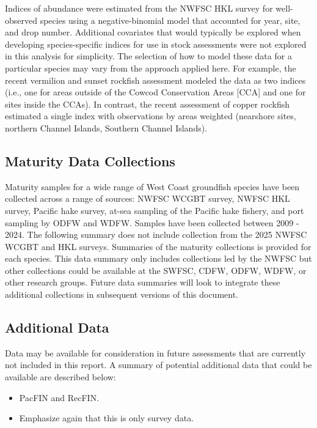 \documentclass[11pt,
  letterpaper,
]{article}
\begin{document}
Indices of abundance were estimated from the NWFSC HKL survey for well-observed species using a negative-binomial model that accounted for year, site, and drop number. Additional covariates that would typically be explored when developing species-specific indices for use in stock assessments were not explored in this analysis for simplicity. The selection of how to model these data for a particular species may vary from the approach applied here. For example, the recent vermilion and sunset rockfish assessment modeled the data as two indices (i.e., one for areas outside of the Cowcod Conservation Areas {[}CCA{]} and one for sites inside the CCAs). In contrast, the recent assessment of copper rockfish estimated a single index with observations by areas weighted (nearshore sites, northern Channel Islands, Southern Channel Islands).

\subsection{Maturity Data Collections}\label{maturity-data-collections}

Maturity samples for a wide range of West Coast groundfish species have been collected across a range of sources: NWFSC WCGBT survey, NWFSC HKL survey, Pacific hake survey, at-sea sampling of the Pacific hake fishery, and port sampling by ODFW and WDFW. Samples have been collected between 2009 - 2024. The following summary does not include collection from the 2025 NWFSC WCGBT and HKL surveys. Summaries of the maturity collections is provided for each species. This data summary only includes collections led by the NWFSC but other collections could be available at the SWFSC, CDFW, ODFW, WDFW, or other research groups. Future data summaries will look to integrate these additional collections in subsequent versions of this document.

\subsection{Additional Data}\label{additional-data}

Data may be available for consideration in future assessments that are currently not included in this report. A summary of potential additional data that could be available are described below:

\begin{itemize}
\item
  PacFIN and RecFIN.
\item
  Emphasize again that this is only survey data.
\end{itemize}
\end{document}
